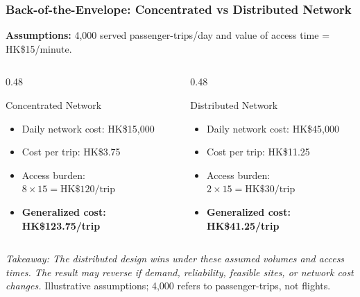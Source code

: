 \documentclass{beamer}
\begin{document}
\begin{frame}[t,shrink=12]
\frametitle{Back-of-the-Envelope: Concentrated vs Distributed Network}
\textbf{Assumptions:} 4,000 served passenger-trips/day and value of access time = HK\$15/minute.
\begin{columns}[T]
\begin{column}{0.48\textwidth}\begin{block}{Concentrated Network}
\begin{itemize}
\item Daily network cost: HK\$15,000
\item Cost per trip: HK\$3.75
\item Access burden: $8\times15=\text{HK\$120/trip}$
\item \textbf{Generalized cost: HK\$123.75/trip}
\end{itemize}\end{block}\end{column}
\begin{column}{0.48\textwidth}\begin{block}{Distributed Network}
\begin{itemize}
\item Daily network cost: HK\$45,000
\item Cost per trip: HK\$11.25
\item Access burden: $2\times15=\text{HK\$30/trip}$
\item \textbf{Generalized cost: HK\$41.25/trip}
\end{itemize}\end{block}\end{column}
\end{columns}
\textit{Takeaway: The distributed design wins under these assumed volumes and access times. The result may reverse if demand, reliability, feasible sites, or network cost changes.}
\vfill{\tiny Illustrative assumptions; 4,000 refers to passenger-trips, not flights.}
\end{frame}
\end{document}
